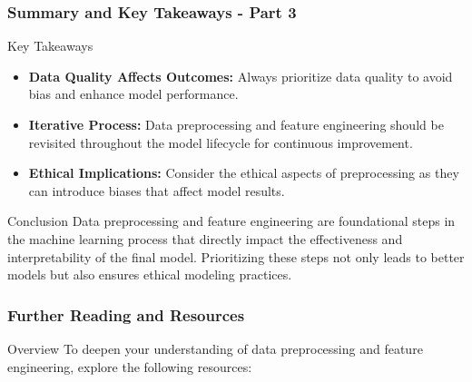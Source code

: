 \documentclass[aspectratio=169]{beamer}
\begin{document}
\begin{frame}[fragile]
    \frametitle{Summary and Key Takeaways - Part 3}
    
    \begin{block}{Key Takeaways}
        \begin{itemize}
            \item \textbf{Data Quality Affects Outcomes:} Always prioritize data quality to avoid bias and enhance model performance.
            \item \textbf{Iterative Process:} Data preprocessing and feature engineering should be revisited throughout the model lifecycle for continuous improvement.
            \item \textbf{Ethical Implications:} Consider the ethical aspects of preprocessing as they can introduce biases that affect model results.
        \end{itemize}
    \end{block}

    \begin{block}{Conclusion}
        Data preprocessing and feature engineering are foundational steps in the machine learning process that directly impact the effectiveness and interpretability of the final model. Prioritizing these steps not only leads to better models but also ensures ethical modeling practices.
    \end{block}

\end{frame}

\begin{frame}
    \frametitle{Further Reading and Resources}
    \begin{block}{Overview}
        To deepen your understanding of data preprocessing and feature engineering, explore the following resources:
    \end{block}
\end{frame}
\end{document}
